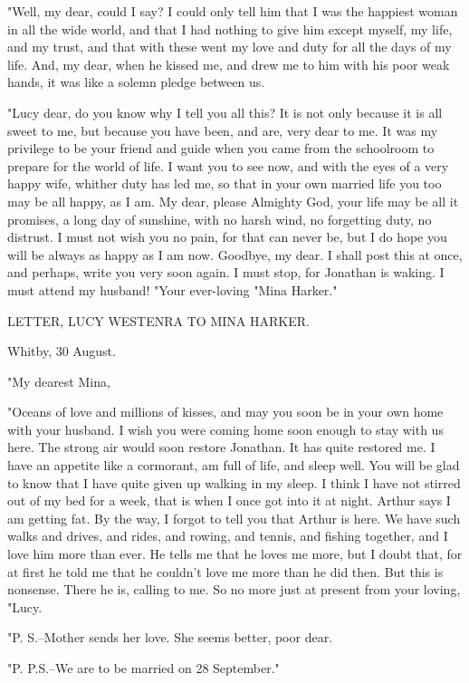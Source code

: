 "Well, my dear, could I say? I could only tell him that I was the happiest woman in all the wide world, and that I had nothing to give him except myself, my life, and my trust, and that with these went my love and duty for all the days of my life. And, my dear, when he kissed me, and drew me to him with his poor weak hands, it was like a solemn pledge between us. 

"Lucy dear, do you know why I tell you all this? It is not only because it is all sweet to me, but because you have been, and are, very dear to me. It was my privilege to be your friend and guide when you came from the schoolroom to prepare for the world of life. I want you to see now, and with the eyes of a very happy wife, whither duty has led me, so that in your own married life you too may be all happy, as I am. My dear, please Almighty God, your life may be all it promises, a long day of sunshine, with no harsh wind, no forgetting duty, no distrust. I must not wish you no pain, for that can never be, but I do hope you will be always as happy as I am now. Goodbye, my dear. I shall post this at once, and perhaps, write you very soon again. I must stop, for Jonathan is waking. I must attend my husband! "Your ever-loving "Mina Harker." 

LETTER, LUCY WESTENRA TO MINA HARKER. 

Whitby, 30 August. 

"My dearest Mina, 

"Oceans of love and millions of kisses, and may you soon be in your own home with your husband. I wish you were coming home soon enough to stay with us here. The strong air would soon restore Jonathan. It has quite restored me. I have an appetite like a cormorant, am full of life, and sleep well. You will be glad to know that I have quite given up walking in my sleep. I think I have not stirred out of my bed for a week, that is when I once got into it at night. Arthur says I am getting fat. By the way, I forgot to tell you that Arthur is here. We have such walks and drives, and rides, and rowing, and tennis, and fishing together, and I love him more than ever. He tells me that he loves me more, but I doubt that, for at first he told me that he couldn't love me more than he did then. But this is nonsense. There he is, calling to me. So no more just at present from your loving, "Lucy. 

"P. S.--Mother sends her love. She seems better, poor dear. 

"P. P.S.--We are to be married on 28 September." 

